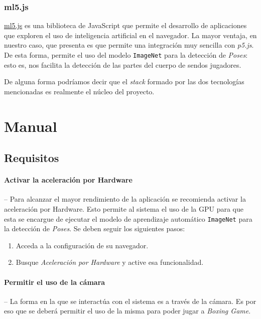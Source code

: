 \documentclass{article}
\begin{document}
\subsubsection{ml5.js}

\href{https://ml5js.org/}{ml5.js} es una biblioteca de JavaScript que permite el desarrollo de aplicaciones que exploren el uso de inteligencia artificial en el navegador. La mayor ventaja, en nuestro caso, que presenta es que permite una integración muy sencilla con \textit{p5.js}. De esta forma, permite el uso del modelo \texttt{ImageNet} para la detección de \textit{Poses}: esto es, nos facilita la detección de las partes del cuerpo de sendos jugadores.

De alguna forma podríamos decir que el \textit{stack} formado por las dos tecnologías mencionadas es realmente el núcleo del proyecto.

\section{Manual}
\label{section:manual}

\subsection{Requisitos}

\paragraph{Activar la aceleración por Hardware} \mbox{} -- Para alcanzar el mayor rendimiento de la aplicación se recomienda activar la aceleración por Hardware. Esto permite al sistema el uso de la GPU para que esta se encargue de ejecutar el modelo de aprendizaje automático \texttt{ImageNet} para la detección de \textit{Poses}. Se deben seguir los siguientes pasos:

\begin{enumerate}
    \item Acceda a la configuración de su navegador.
    \item Busque \textit{Aceleración por Hardware} y active esa funcionalidad.
\end{enumerate}

\paragraph{Permitir el uso de la cámara} \mbox{} -- La forma en la que se interactúa con el sistema es a través de la cámara. Es por eso que se deberá permitir el uso de la misma para poder jugar a \textit{Boxing Game}.
\end{document}
